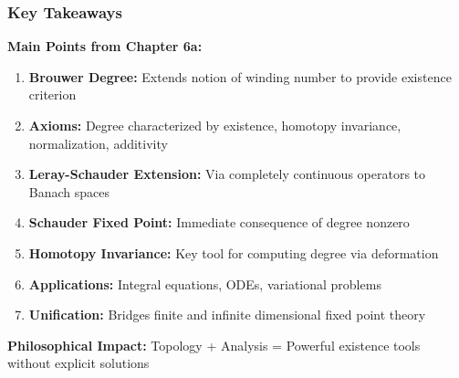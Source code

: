 \documentclass[aspectratio=169,10pt]{beamer}
\begin{document}
\begin{frame}
\frametitle{Key Takeaways}

\vspace{0.3cm}
\textbf{Main Points from Chapter 6a:}

\begin{enumerate}
    \item \textbf{Brouwer Degree:} Extends notion of winding number to provide existence criterion
    \vspace{0.2cm}
    \item \textbf{Axioms:} Degree characterized by existence, homotopy invariance, normalization, additivity
    \vspace{0.2cm}
    \item \textbf{Leray-Schauder Extension:} Via completely continuous operators to Banach spaces
    \vspace{0.2cm}
    \item \textbf{Schauder Fixed Point:} Immediate consequence of degree nonzero
    \vspace{0.2cm}
    \item \textbf{Homotopy Invariance:} Key tool for computing degree via deformation
    \vspace{0.2cm}
    \item \textbf{Applications:} Integral equations, ODEs, variational problems
    \vspace{0.2cm}
    \item \textbf{Unification:} Bridges finite and infinite dimensional fixed point theory
\end{enumerate}

\vspace{0.4cm}
\textbf{Philosophical Impact:} Topology + Analysis = Powerful existence tools without explicit solutions
\end{frame}
\end{document}
